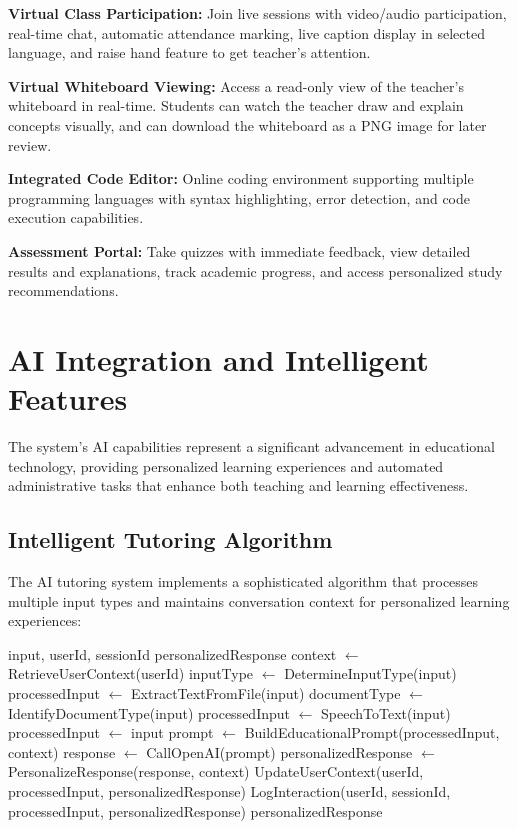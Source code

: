 \documentclass[onecolumn]{IEEEtran}
\begin{document}
\textbf{Virtual Class Participation:} Join live sessions with video/audio participation, real-time chat, automatic attendance marking, live caption display in selected language, and raise hand feature to get teacher's attention.

\textbf{Virtual Whiteboard Viewing:} Access a read-only view of the teacher's whiteboard in real-time. Students can watch the teacher draw and explain concepts visually, and can download the whiteboard as a PNG image for later review.

\textbf{Integrated Code Editor:} Online coding environment supporting multiple programming languages with syntax highlighting, error detection, and code execution capabilities.

\textbf{Assessment Portal:} Take quizzes with immediate feedback, view detailed results and explanations, track academic progress, and access personalized study recommendations.

\section{AI Integration and Intelligent Features}

The system's AI capabilities represent a significant advancement in educational technology, providing personalized learning experiences and automated administrative tasks that enhance both teaching and learning effectiveness.

\subsection{Intelligent Tutoring Algorithm}

The AI tutoring system implements a sophisticated algorithm that processes multiple input types and maintains conversation context for personalized learning experiences:

\begin{algorithm}
\caption{AI Tutoring Processing Algorithm}
\begin{algorithmic}[1]
\REQUIRE input, userId, sessionId
\ENSURE personalizedResponse
\STATE context $\leftarrow$ RetrieveUserContext(userId)
\STATE inputType $\leftarrow$ DetermineInputType(input)
\STATE processedInput $\leftarrow$ ExtractTextFromFile(input)
\STATE documentType $\leftarrow$ IdentifyDocumentType(input)
\STATE processedInput $\leftarrow$ SpeechToText(input)
\ELSE
\STATE processedInput $\leftarrow$ input
\ENDIF
\STATE prompt $\leftarrow$ BuildEducationalPrompt(processedInput, context)
\STATE response $\leftarrow$ CallOpenAI(prompt)
\STATE personalizedResponse $\leftarrow$ PersonalizeResponse(response, context)
\STATE UpdateUserContext(userId, processedInput, personalizedResponse)
\STATE LogInteraction(userId, sessionId, processedInput, personalizedResponse)
\RETURN personalizedResponse
\end{algorithmic}
\end{algorithm}
\end{document}
